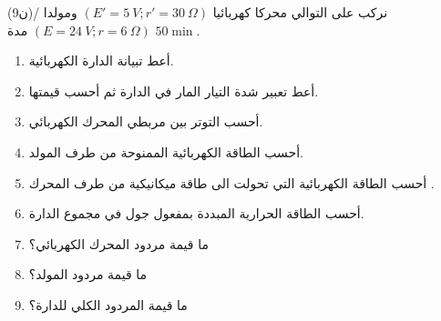 \documentclass[14pt,a4paper]{extarticle}
\begin{document}
\vspace{-0.7cm}
\begin{exercice}{(9ن)}/
نركب على التوالي 
محركا كهربائيا 
$(E' = 5\ V;r'=30\ \Omega)$
ومولدا 
$(E = 24\ V;r=6\ \Omega)$
مدة 
$50\min$.
\begin{enumerate}
\item أعط تبيانة الدارة الكهربائية.
\item
أعط تعبير
 شدة التيار المار في الدارة 
ثم أحسب قيمتها.
\item أحسب التوتر بين مربطي المحرك الكهربائي.
\item أحسب الطاقة الكهربائية الممنوحة من طرف المولد.
\item أحسب الطاقة الكهربائية التي تحولت الى طاقة ميكانيكية من طرف المحرك .
\item أحسب الطاقة الحرارية المبددة بمفعول جول في مجموع الدارة.
\item ما قيمة مردود المحرك الكهربائي؟
\item ما قيمة مردود المولد؟
\item ما قيمة المردود الكلي للدارة؟
\end{enumerate}
\end{exercice}
\end{document}
